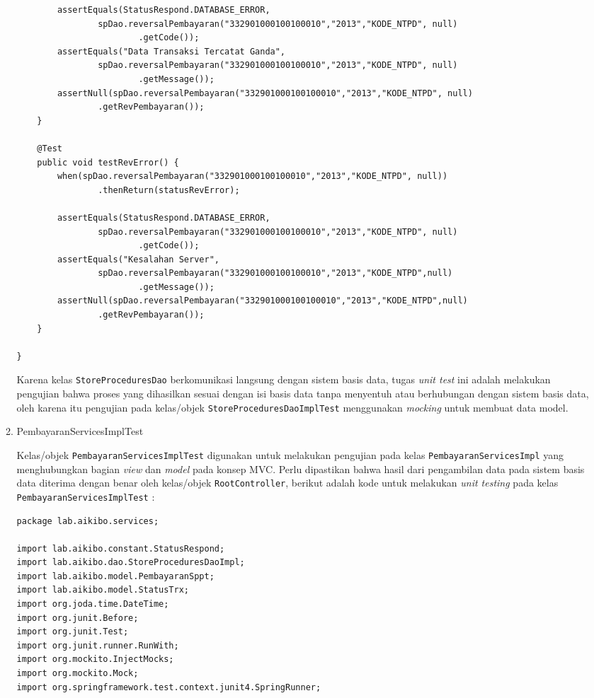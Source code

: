 \documentclass[pdftex,12pt, oneside]{article}
\begin{document}
\begin{enumerate}[A.]
\begin{enumerate}[1.]
\begin{lstlisting}
        assertEquals(StatusRespond.DATABASE_ERROR,
                spDao.reversalPembayaran("332901000100100010","2013","KODE_NTPD", null)
                        .getCode());
        assertEquals("Data Transaksi Tercatat Ganda",
                spDao.reversalPembayaran("332901000100100010","2013","KODE_NTPD", null)
                        .getMessage());
        assertNull(spDao.reversalPembayaran("332901000100100010","2013","KODE_NTPD", null)
                .getRevPembayaran());
    }

    @Test
    public void testRevError() {
        when(spDao.reversalPembayaran("332901000100100010","2013","KODE_NTPD", null))
                .thenReturn(statusRevError);

        assertEquals(StatusRespond.DATABASE_ERROR,
                spDao.reversalPembayaran("332901000100100010","2013","KODE_NTPD", null)
                        .getCode());
        assertEquals("Kesalahan Server",
                spDao.reversalPembayaran("332901000100100010","2013","KODE_NTPD",null)
                        .getMessage());
        assertNull(spDao.reversalPembayaran("332901000100100010","2013","KODE_NTPD",null)
                .getRevPembayaran());
    }

}
    \end{lstlisting}
    
    Karena kelas \texttt{StoreProceduresDao} berkomunikasi langsung dengan sistem basis data, tugas \textit{unit test} ini adalah melakukan pengujian bahwa proses yang dihasilkan sesuai dengan isi basis data tanpa menyentuh atau berhubungan dengan sistem basis data, oleh karena itu pengujian pada kelas/objek \texttt{StoreProceduresDaoImplTest} menggunakan \textit{mocking} untuk membuat data model.
    
    \item PembayaranServicesImplTest
    
    Kelas/objek \texttt{PembayaranServicesImplTest} digunakan untuk melakukan pengujian pada kelas \texttt{PembayaranServicesImpl} yang menghubungkan bagian \textit{view} dan \textit{model} pada konsep MVC. Perlu dipastikan bahwa hasil dari pengambilan data pada sistem basis data diterima dengan benar oleh kelas/objek \texttt{RootController}, berikut adalah kode untuk melakukan \textit{unit testing} pada kelas \texttt{PembayaranServicesImplTest} :
    
    \begin{lstlisting}
package lab.aikibo.services;

import lab.aikibo.constant.StatusRespond;
import lab.aikibo.dao.StoreProceduresDaoImpl;
import lab.aikibo.model.PembayaranSppt;
import lab.aikibo.model.StatusTrx;
import org.joda.time.DateTime;
import org.junit.Before;
import org.junit.Test;
import org.junit.runner.RunWith;
import org.mockito.InjectMocks;
import org.mockito.Mock;
import org.springframework.test.context.junit4.SpringRunner;


\end{lstlisting}
\end{enumerate}
\end{enumerate}
\end{document}
